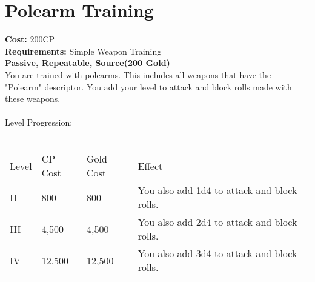 \section{Polearm Training}\label{perk:polearmTraining}
\textbf{Cost:} 200CP\\
\textbf{Requirements:} Simple Weapon Training\\
\textbf{Passive, Repeatable, Source(200 Gold)}\\
You are trained with polearms.
This includes all weapons that have the "Polearm" descriptor.
You add your level to attack and block rolls made with these weapons.\\
\\
Level Progression:\\
\\
\begin{tabular}{l | l | l | l}
	Level & CP Cost & Gold Cost & Effect\\
	II & 800 & 800 & You also add 1d4 to attack and block rolls.\\
	III & 4,500 & 4,500 & You also add 2d4 to attack and block rolls.\\
	IV & 12,500 & 12,500 & You also add 3d4 to attack and block rolls.\\
\end{tabular}